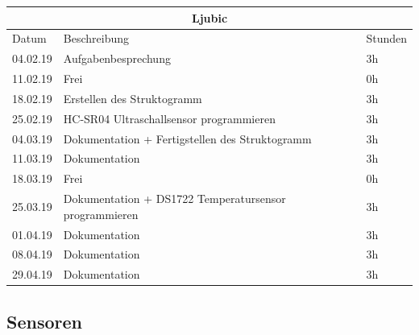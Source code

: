 \documentclass[12pt,a4paper]{article}
\begin{document}
\begin{table}[H]
\centering 
\begin{tabular}{|l|l|l|}
\hline
\multicolumn{3}{|c|}{Ljubic}   \\ \hline
Datum & Beschreibung & Stunden \\ \hline
04.02.19 & Aufgabenbesprechung & 3h \\ \hline
11.02.19 & Frei & 0h \\ \hline
18.02.19 & Erstellen des Struktogramm  & 3h \\ \hline
25.02.19 & HC-SR04 Ultraschallsensor programmieren & 3h \\ \hline
04.03.19 & Dokumentation + Fertigstellen des Struktogramm & 3h \\ \hline
11.03.19 & Dokumentation & 3h \\ \hline
18.03.19 & Frei & 0h\\ \hline
25.03.19 & Dokumentation + DS1722 Temperatursensor programmieren & 3h \\ \hline
01.04.19 & Dokumentation & 3h \\ \hline
08.04.19 & Dokumentation & 3h \\ \hline
29.04.19 & Dokumentation & 3h \\ \hline
\end{tabular}
\end{table}

\subsection{Sensoren}
\end{document}
